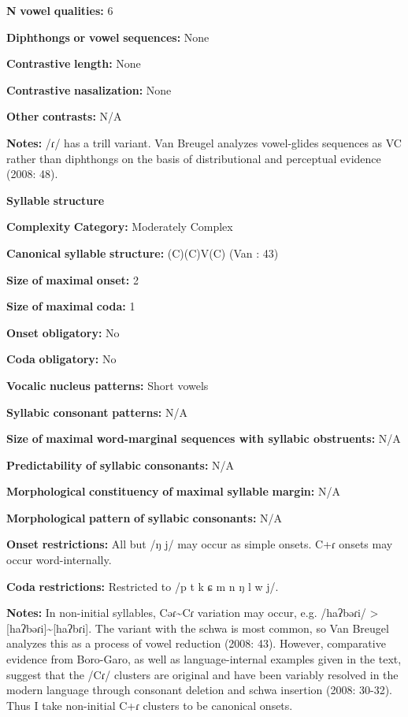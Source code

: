 \begin{styleBody}
\textbf{N} \textbf{vowel} \textbf{qualities:} 6

\textbf{Diphthongs} \textbf{or} \textbf{vowel} \textbf{sequences:} None

\textbf{Contrastive} \textbf{length:} None

\textbf{Contrastive} \textbf{nasalization:} None

\textbf{Other} \textbf{contrasts:} N/A

\textbf{Notes:} /ɾ/ has a trill variant. Van Breugel analyzes vowel-glides sequences as VC rather than diphthongs on the basis of distributional and perceptual evidence (2008: 48).

\textbf{Syllable} \textbf{structure}

\textbf{Complexity} \textbf{Category:} Moderately Complex

\textbf{Canonical} \textbf{syllable} \textbf{structure:} (C)(C)V(C) (Van \citealt{Breugel2008}: 43)

\textbf{Size} \textbf{of} \textbf{maximal} \textbf{onset:} 2

\textbf{Size} \textbf{of} \textbf{maximal} \textbf{coda:} 1

\textbf{Onset} \textbf{obligatory:} No

\textbf{Coda} \textbf{obligatory:} No

\textbf{Vocalic} \textbf{nucleus} \textbf{patterns:} Short vowels

\textbf{Syllabic} \textbf{consonant} \textbf{patterns:} N/A

\textbf{Size} \textbf{of} \textbf{maximal} \textbf{word{}-marginal sequences with syllabic obstruents:} N/A

\textbf{Predictability} \textbf{of} \textbf{syllabic} \textbf{consonants:} N/A

\textbf{Morphological} \textbf{constituency} \textbf{of} \textbf{maximal} \textbf{syllable} \textbf{margin:} N/A

\textbf{Morphological} \textbf{pattern} \textbf{of} \textbf{syllabic} \textbf{consonants:} N/A

\textbf{Onset} \textbf{restrictions:} All but /ŋ j/ may occur as simple onsets. C+ɾ onsets may occur word-internally.

\textbf{Coda} \textbf{restrictions:} Restricted to /p t k ɕ m n ŋ l w j/. 

\textbf{Notes:} In non-initial syllables, Cəɾ{\textasciitilde}Cɾ variation may occur, e.g. /haʔbəɾi/ > [haʔbəɾi]{\textasciitilde}[haʔbɾi]. The variant with the schwa is most common, so Van Breugel analyzes this as a process of vowel reduction (2008: 43). However, comparative evidence from Boro-Garo, as well as language-internal examples given in the text, suggest that the /Cɾ/ clusters are original and have been variably resolved in the modern language through consonant deletion and schwa insertion (2008: 30-32). Thus I take non-initial C+ɾ clusters to be canonical onsets.


\end{styleBody}
